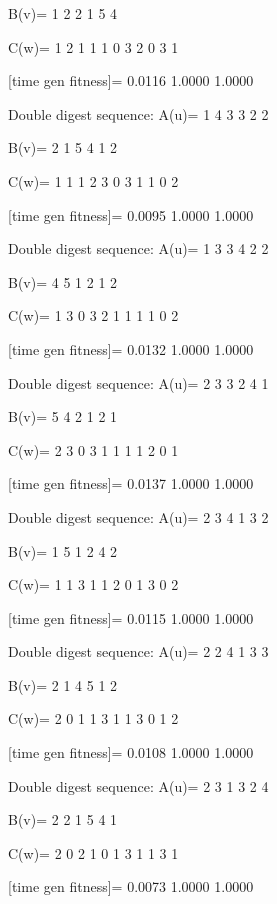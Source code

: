 B(v)=
     1     2     2     1     5     4

C(w)=
     1     2     1     1     1     0     3     2     0     3     1

[time gen fitness]=
    0.0116    1.0000    1.0000

Double digest sequence:
A(u)=
     1     4     3     3     2     2

B(v)=
     2     1     5     4     1     2

C(w)=
     1     1     1     2     3     0     3     1     1     0     2

[time gen fitness]=
    0.0095    1.0000    1.0000

Double digest sequence:
A(u)=
     1     3     3     4     2     2

B(v)=
     4     5     1     2     1     2

C(w)=
     1     3     0     3     2     1     1     1     1     0     2

[time gen fitness]=
    0.0132    1.0000    1.0000

Double digest sequence:
A(u)=
     2     3     3     2     4     1

B(v)=
     5     4     2     1     2     1

C(w)=
     2     3     0     3     1     1     1     1     2     0     1

[time gen fitness]=
    0.0137    1.0000    1.0000

Double digest sequence:
A(u)=
     2     3     4     1     3     2

B(v)=
     1     5     1     2     4     2

C(w)=
     1     1     3     1     1     2     0     1     3     0     2

[time gen fitness]=
    0.0115    1.0000    1.0000

Double digest sequence:
A(u)=
     2     2     4     1     3     3

B(v)=
     2     1     4     5     1     2

C(w)=
     2     0     1     1     3     1     1     3     0     1     2

[time gen fitness]=
    0.0108    1.0000    1.0000

Double digest sequence:
A(u)=
     2     3     1     3     2     4

B(v)=
     2     2     1     5     4     1

C(w)=
     2     0     2     1     0     1     3     1     1     3     1

[time gen fitness]=
    0.0073    1.0000    1.0000


